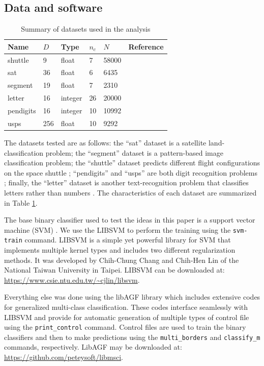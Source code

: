 \documentclass{article}
\begin{document}
\subsection{Data and software}

\begin{table}
	\caption{Summary of datasets used in the analysis}\label{datasets}
	\begin{tabular}{|l|lllll|}
	\hline
	Name & $D$ & Type & $n_c$ & $N$ & Reference \\\hline
	shuttle & 9 & float & 7 & 58000 & {\small \citep{King_etal1995}}\\
	sat & 36 & float & 6 & 6435 & {\small \citep{King_etal1995}}\\
	segment & 19 & float & 7 & 2310 & {\small \citep{King_etal1995}} \\
	letter &  16 & integer & 26 & 20000 & {\small \citep{Frey_Slate1991}}\\
	pendigits & 16 & integer & 10 & 10992 & {\small \citep{Alimoglu1996}}\\
	usps & 256 & float & 10 & 9292 & {\small \citep{Hull1994}}\\
	\hline
\end{tabular}
\end{table}

The datasets tested are as follows: 
the ``sat'' dataset is a satellite land-classification problem;
the ``segment'' dataset is a pattern-based image classification problem;
the ``shuttle'' dataset predicts different flight configurations on the
space shuttle \citep{Michie_etal1994, King_etal1995};
``pendigits'' and ``usps'' are both digit recognition problems 
\citep{Alimoglu1996, Hull1994};
finally, the ``letter'' dataset is another text-recognition problem 
that classifies letters rather than numbers 
\citep{Frey_Slate1991}.
The characteristics of each dataset are summarized in Table \ref{datasets}.

The base binary classifier used to test the ideas in this paper is a 
support vector machine (SVM) \citep{Mueller_etal2001}.
We use the LIBSVM \citep{Chang_Lin2011} to perform the training
using the \verb/svm-train/ command.
LIBSVM is a simple yet powerful library for SVM that implements multiple
kernel types and includes two different regularization methods.
It was developed by Chih-Chung Chang and Chih-Hen Lin of the National
Taiwan University in Taipei.
LIBSVM can be downloaded at: \url{https://www.csie.ntu.edu.tw/~cjlin/libsvm}.

Everything else was done using the libAGF library \citep{Mills2011}
which includes extensive codes for generalized multi-class classification.
These codes interface seamlessly with LIBSVM and provide for automatic
generation of multiple types of control file using the \verb/print_control/
command.
Control files are used to train the binary classifiers and then
to make predictions using the \verb/multi_borders/ and \verb/classify_m/
commands, respectively.
LibAGF may be downloaded at: \url{https://github.com/peteysoft/libmsci}.


\end{document}

